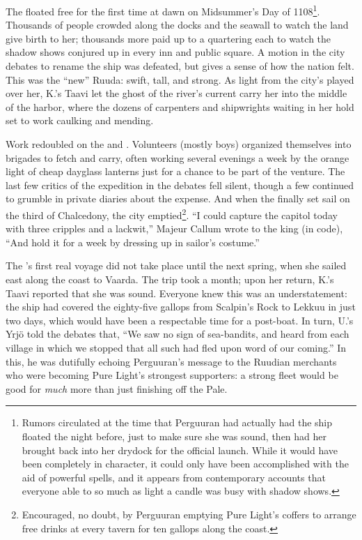 \documentclass[12pt]{report}
\begin{document}
The  floated free for the first time at dawn on
Midsummer's Day of 1108\footnote{Rumors circulated at the time that
Perguuran had actually had the ship floated the night before, just to
make sure she was sound, then had her brought back into her drydock
for the official launch.  While it would have been completely in
character, it could only have been accomplished with the aid of
powerful spells, and it appears from contemporary accounts that
everyone able to so much as light a candle was busy with shadow
shows.}.  Thousands of people crowded along the docks and the seawall
to watch the land give birth to her; thousands more paid up to a
quartering each to watch the shadow shows conjured up in every inn and
public square.  A motion in the city debates to rename the ship
 was defeated, but gives a sense of how the nation
felt.  This was the ``new'' Ruuda: swift, tall, and strong.  As light
from the city's  played over her, K.'s Taavi let
the ghost of the river's current carry her into the middle of the
harbor, where the dozens of carpenters and shipwrights waiting in her
hold set to work caulking and mending.

Work redoubled on the  and .  Volunteers (mostly boys) organized themselves into brigades to
fetch and carry, often working several evenings a week by the orange
light of cheap dayglass lanterns just for a chance to be part of the
venture.  The last few critics of the expedition in the debates fell
silent, though a few continued to grumble in private diaries about the
expense.  And when the  finally set sail on the
third of Chalcedony, the city emptied\footnote{Encouraged, no doubt,
by Perguuran emptying Pure Light's coffers to arrange free drinks at
every tavern for ten gallops along the coast.}.  ``I could capture the
capitol today with three cripples and a lackwit,'' Majeur Callum wrote
to the king (in code), ``And hold it for a week by dressing up in
sailor's costume.''

The 's first real voyage did not take place
until the next spring, when she sailed east along the coast to Vaarda.
The trip took a month; upon her return, K.'s Taavi reported that she
was sound.  Everyone knew this was an understatement: the ship had
covered the eighty-five gallops from Scalpin's Rock to Lekkuu in just
two days, which would have been a respectable time for a post-boat.
In turn, U.'s Yrj\"{o} told the debates that, ``We saw no sign of
sea-bandits, and heard from each village in which we stopped that all
such had fled upon word of our coming.''  In this, he was dutifully
echoing Perguuran's message to the Ruudian merchants who were becoming
Pure Light's strongest supporters: a strong fleet would be good for
\emph{much} more than just finishing off the Pale.
\end{document}
